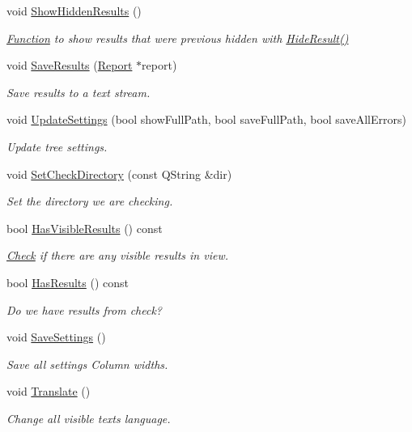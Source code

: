 \begin{DoxyCompactItemize}
void \hyperlink{class_results_tree_aadc731849f76930eb6f345e697515e0f}{Show\-Hidden\-Results} ()
\begin{DoxyCompactList}\small\item\em \hyperlink{class_function}{Function} to show results that were previous hidden with \hyperlink{class_results_tree_a8abdbfd6501d249c9da5bc0e875d5883}{Hide\-Result()} \end{DoxyCompactList}\item 
void \hyperlink{class_results_tree_a827aaff4ba614e26909624cb8bb3436e}{Save\-Results} (\hyperlink{class_report}{Report} $\ast$report)
\begin{DoxyCompactList}\small\item\em Save results to a text stream. \end{DoxyCompactList}\item 
void \hyperlink{class_results_tree_afdc60aa0433b989329650053593c9c8c}{Update\-Settings} (bool show\-Full\-Path, bool save\-Full\-Path, bool save\-All\-Errors)
\begin{DoxyCompactList}\small\item\em Update tree settings. \end{DoxyCompactList}\item 
void \hyperlink{class_results_tree_a0fb705da7b19819e3d7dda37ee8c3911}{Set\-Check\-Directory} (const Q\-String \&dir)
\begin{DoxyCompactList}\small\item\em Set the directory we are checking. \end{DoxyCompactList}\item 
bool \hyperlink{class_results_tree_a564d0a88e01b546e3ce567b14997ebdd}{Has\-Visible\-Results} () const 
\begin{DoxyCompactList}\small\item\em \hyperlink{class_check}{Check} if there are any visible results in view. \end{DoxyCompactList}\item 
bool \hyperlink{class_results_tree_a18fae258228df50cd36a277eb5d73f6c}{Has\-Results} () const 
\begin{DoxyCompactList}\small\item\em Do we have results from check? \end{DoxyCompactList}\item 
void \hyperlink{class_results_tree_a897f4c23156619b6e780552eaabeaeb5}{Save\-Settings} ()
\begin{DoxyCompactList}\small\item\em Save all settings Column widths. \end{DoxyCompactList}\item 
void \hyperlink{class_results_tree_a4622fde8ddf593104a0146d3a76cbfa3}{Translate} ()
\begin{DoxyCompactList}\small\item\em Change all visible texts language. \end{DoxyCompactList}\end{DoxyCompactItemize}
